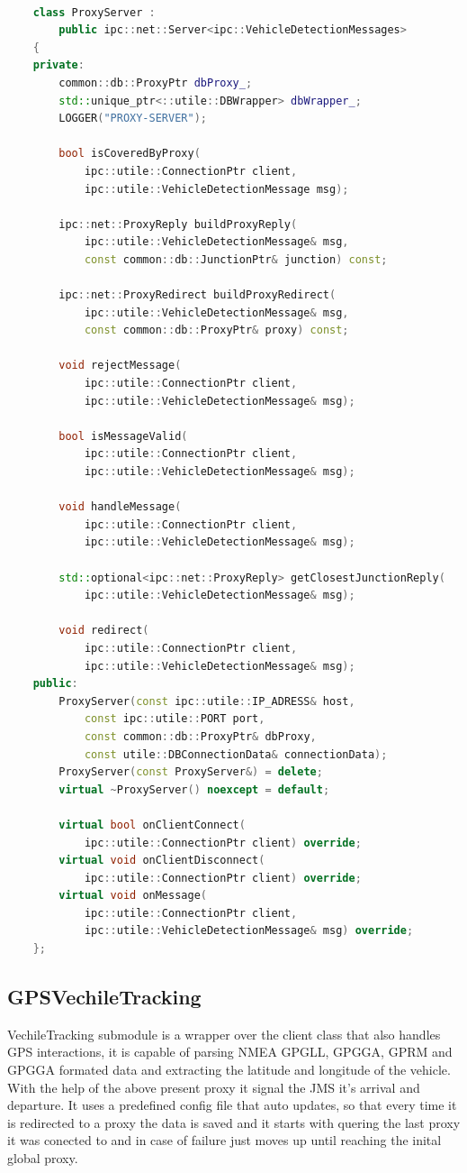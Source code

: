 \documentclass[17pt]{article}
\begin{document}
\begin{lstlisting}[language= C++]

	class ProxyServer : 
        public ipc::net::Server<ipc::VehicleDetectionMessages>
	{
	private:
		common::db::ProxyPtr dbProxy_;
		std::unique_ptr<::utile::DBWrapper> dbWrapper_;
		LOGGER("PROXY-SERVER");

		bool isCoveredByProxy(
            ipc::utile::ConnectionPtr client,
            ipc::utile::VehicleDetectionMessage msg);
    
		ipc::net::ProxyReply buildProxyReply(
            ipc::utile::VehicleDetectionMessage& msg,
            const common::db::JunctionPtr& junction) const;
    
		ipc::net::ProxyRedirect buildProxyRedirect(
            ipc::utile::VehicleDetectionMessage& msg,
            const common::db::ProxyPtr& proxy) const;
    
		void rejectMessage(
            ipc::utile::ConnectionPtr client,
            ipc::utile::VehicleDetectionMessage& msg);

		bool isMessageValid(
            ipc::utile::ConnectionPtr client,
            ipc::utile::VehicleDetectionMessage& msg);
    
		void handleMessage(
            ipc::utile::ConnectionPtr client,
            ipc::utile::VehicleDetectionMessage& msg);
        
		std::optional<ipc::net::ProxyReply> getClosestJunctionReply(
            ipc::utile::VehicleDetectionMessage& msg);
        
		void redirect(
            ipc::utile::ConnectionPtr client,
            ipc::utile::VehicleDetectionMessage& msg);
	public:
		ProxyServer(const ipc::utile::IP_ADRESS& host, 
			const ipc::utile::PORT port,
			const common::db::ProxyPtr& dbProxy,
			const utile::DBConnectionData& connectionData);
		ProxyServer(const ProxyServer&) = delete;
		virtual ~ProxyServer() noexcept = default;

		virtual bool onClientConnect(
            ipc::utile::ConnectionPtr client) override;
		virtual void onClientDisconnect(
            ipc::utile::ConnectionPtr client) override;
		virtual void onMessage(
            ipc::utile::ConnectionPtr client,
            ipc::utile::VehicleDetectionMessage& msg) override;
	};
\end{lstlisting}
\pagebreak

\subsection{GPSVechileTracking}
\indent \indent
VechileTracking submodule is a wrapper over the client class that also 
handles GPS interactions, it is capable of parsing NMEA GPGLL, GPGGA, GPRM
and GPGGA formated data and extracting the latitude and longitude of the
vehicle. With the help of the above present proxy it signal the JMS it's
arrival and  departure. It uses a predefined config file that auto updates,
so that every time it is redirected to a proxy the data is saved and it
starts with  quering the last proxy it was conected to and in case of failure
just moves up until reaching the inital global proxy.
\end{document}
